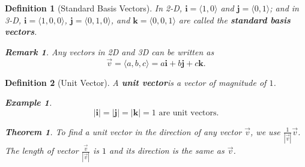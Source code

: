\documentclass[12pt,a4paper]{article}
\newtheorem{thm}{Theorem}[subsection]
\newtheorem{df}{Definition}[subsection]
\newtheorem{eg}{Example}[subsection]
\newtheorem*{rmk}{\indent Remark}
\def\vecv{\vec{v}}
\def\veci{\boldsymbol{\textbf{i}}}
\def\vecj{\boldsymbol{\textbf{j}}}
\def\veck{\boldsymbol{\textbf{k}}}
\begin{document}
\begin{df}[Standard Basis Vectors]
	In 2-D, $\veci=\langle 1,0\rangle$ and $\vecj=\langle0,1\rangle$; and in 3-D, $\veci=\langle1,0,0\rangle$, $\vecj=\langle0,1,0\rangle$, and $\veck=\langle0,0,1\rangle$ are called the \textbf{standard basis vectors}. 
	\begin{rmk} Any vectors in 2D and 3D can be written as \[\vecv=\langle a,b,c\rangle=a\veci+b\vecj+c\veck.\]\end{rmk}
\end{df}
\begin{df}[Unit Vector]
	A \textbf{unit vector}is a vector of magnitude of $1$. 
	\begin{eg} \[|\veci|=|\vecj|=|\veck|=1\text{ are unit vectors.}\]\end{eg}
	\begin{thm}
		To find a unit vector in the direction of any vector $\vecv$, we use $\displaystyle\frac{1}{|\vecv|}\vecv$. The length of vector $\displaystyle\frac{\vecv}{|\vecv|}$ is $1$ and its direction is the same as $\vecv$.	
	\end{thm}
\end{df}
\end{document}
